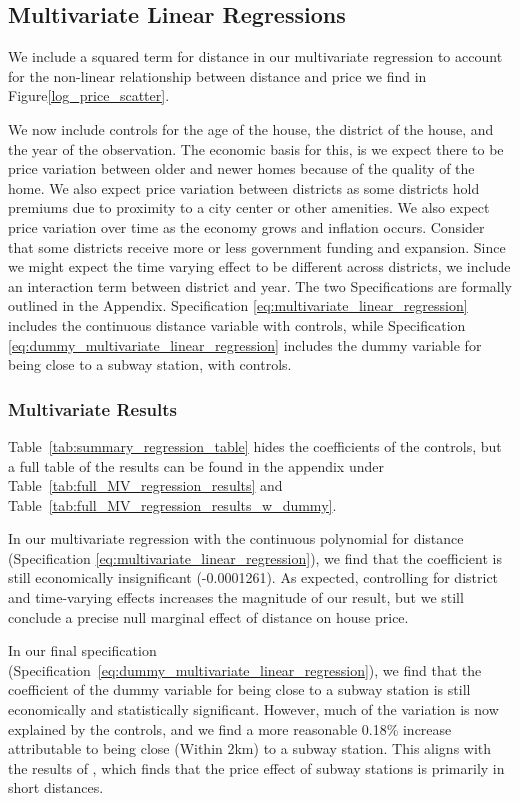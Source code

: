 \subsection{Multivariate Linear Regressions}
We include a squared term for distance in our multivariate regression to account for the non-linear relationship between distance and price we find in Figure\ref{log_price_scatter}.

We now include controls for the age of the house, the district of the house, and the year of the observation. The economic basis for this, is we expect there to be 
price variation between older and newer homes because of the quality of the home. We also expect price variation between districts as some districts
hold premiums due to proximity to a city center or other amenities. We also expect price variation over time as the economy grows and inflation occurs.
Consider that some districts receive more or less government funding and expansion. Since we might expect the time varying effect to be different across districts, we include an interaction term between district and year.
The two Specifications are formally outlined in the Appendix. Specification \ref{eq:multivariate_linear_regression} includes the continuous distance variable with controls, while Specification \ref{eq:dummy_multivariate_linear_regression} 
includes the dummy variable for being close to a subway station, with controls.

\subsubsection{Multivariate Results}
Table~\ref{tab:summary_regression_table} hides the coefficients of the controls, but a full table of the results can be found in the appendix under Table~\ref{tab:full_MV_regression_results} and Table~\ref{tab:full_MV_regression_results_w_dummy}.

In our multivariate regression with the continuous polynomial for distance (Specification \ref{eq:multivariate_linear_regression}), we find that the coefficient is still economically insignificant (-0.0001261). As expected, controlling for district and time-varying effects increases the magnitude of our result, 
but we still conclude a precise null marginal effect of distance on house price.

In our final specification (Specification~\ref{eq:dummy_multivariate_linear_regression}),
 we find that the coefficient of the dummy variable for being close to a subway station is still economically and statistically significant. 
 However, much of the variation is now explained by the controls, and we find a more reasonable 0.18\% increase attributable to being close (Within 2km) to a subway station.
 This aligns with the results of \citet{rietveld_2007}, which finds that the price effect of subway stations is primarily in short distances.

